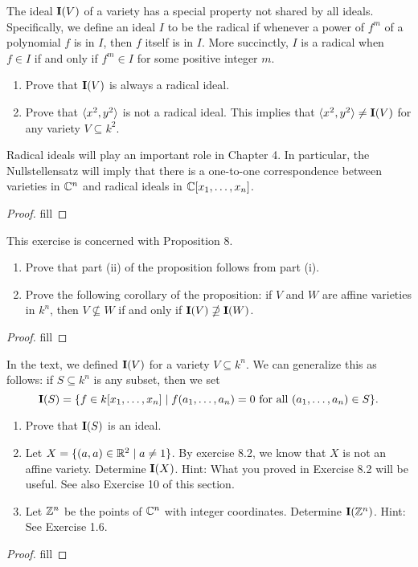 \begin{exercise}{8}
The ideal $\mathbf{I}(V)$ of a variety has a special property not shared by all ideals. Specifically, we define an ideal $I$ to be the radical if whenever a power of $f^m$ of a polynomial $f$ is in $I$, then $f$ itself is in $I$. More succinctly, $I$ is a radical when $f\in I$ if and only if $f^m\in I$ for some positive integer $m$.
\begin{enumerate}
    \item Prove that $\mathbf{I}(V)$ is always a radical ideal.
    \item Prove that $\langle x^2,y^2\rangle$ is not a radical ideal. This implies that $\langle x^2,y^2\rangle\neq \mathbf{I}(V)$ for any variety $V\subseteq k^2$.
\end{enumerate}
Radical ideals will play an important role in Chapter 4. In particular, the Nullstellensatz will imply that there is a one-to-one correspondence between varieties in $\mathbb{C}^n$ and radical ideals in $\mathbb{C}[x_1,\dots,x_n]$.
\end{exercise}
\begin{proof}
fill
\end{proof}

\begin{exercise}{14}
This exercise is concerned with Proposition 8.
\begin{enumerate}
    \item Prove that part (ii) of the proposition follows from part (i).
    \item Prove the following corollary of the proposition: if $V$ and $W$ are affine varieties in $k^n$, then $V\nsubseteq W$ if and only if $\mathbf{I}(V)\nsupseteq\mathbf{I}(W)$.
\end{enumerate}
\end{exercise}
\begin{proof}
fill
\end{proof}

\begin{exercise}{15}
In the text, we defined $\mathbf{I}(V)$ for a variety $V\subseteq k^n$. We can generalize this as follows: if $S\subseteq k^n$ is any subset, then we set
\[
\mathbf{I}(S)=\{f\in k[x_1,\dots,x_n]\mid f(a_1,\dots,a_n)=0\text{ for all }(a_1,\dots,a_n)\in S\}.
\]
\begin{enumerate}
    \item Prove that $\mathbf{I}(S)$ is an ideal.
    \item Let $X=\{(a,a)\in\mathbb{R}^2\mid a\neq 1\}$. By exercise 8.2, we know that $X$ is not an affine variety. Determine $\mathbf{I}(X)$. Hint: What you proved in Exercise 8.2 will be useful. See also Exercise 10 of this section.
    \item Let $\mathbb{Z}^n$ be the points of $\mathbb{C}^n$ with integer coordinates. Determine $\mathbf{I}(\mathbb{Z}^n)$. Hint: See Exercise 1.6.
\end{enumerate}
\end{exercise}
\begin{proof}
fill
\end{proof}
